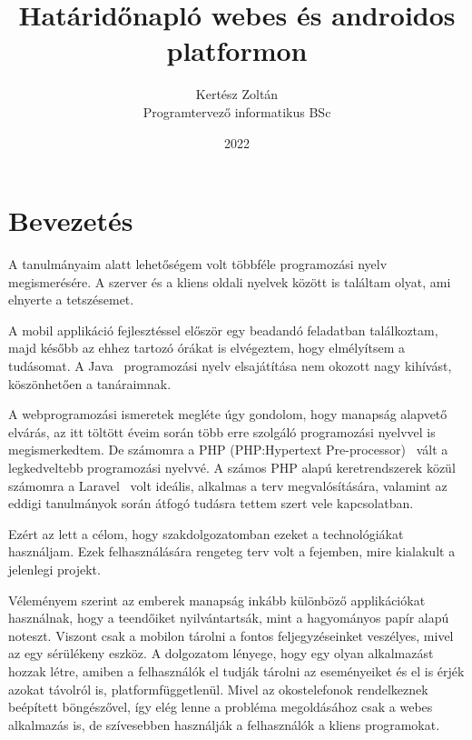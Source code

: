 \documentclass[
]{thesis-ekf}
\theoremstyle{definition}
\theoremstyle{remark}
\begin{document}
	\title{Határidőnapló webes és androidos platformon}
	\author{Kertész Zoltán\\Programtervező informatikus BSc}
	\date{2022}
	\maketitle
	\tableofcontents
	
	\chapter*{Bevezetés}
	A tanulmányaim alatt lehetőségem volt többféle programozási nyelv megismerésére. A szerver és a kliens oldali nyelvek között is találtam olyat, ami elnyerte a tetszésemet. 
	
	A mobil applikáció fejlesztéssel először egy beadandó feladatban találkoztam, majd később az ehhez tartozó órákat is elvégeztem, hogy elmélyítsem a tudásomat. A Java~\cite{java_book} programozási nyelv elsajátítása nem okozott nagy kihívást, köszönhetően a tanáraimnak. 
	
	A webprogramozási ismeretek megléte úgy gondolom, hogy manapság alapvető elvárás, az itt töltött éveim során több erre szolgáló programozási nyelvvel is megismerkedtem. De számomra a PHP (PHP:Hypertext Pre-processor)~\cite{php_doc} vált a legkedveltebb programozási nyelvvé. A számos PHP alapú keretrendszerek közül számomra a Laravel~\cite{laravel_main} volt ideális, alkalmas a terv megvalósítására, valamint az eddigi tanulmányok során átfogó tudásra tettem szert vele kapcsolatban.
	
	Ezért az lett a célom, hogy szakdolgozatomban ezeket a technológiákat használjam. Ezek felhasználására rengeteg terv volt a fejemben, mire kialakult a jelenlegi projekt.
	
	Véleményem szerint az emberek manapság inkább különböző applikációkat használnak, hogy a teendőiket nyilvántartsák, mint a hagyományos papír alapú noteszt. Viszont csak a mobilon tárolni a fontos feljegyzéseinket veszélyes, mivel az egy sérülékeny eszköz. A dolgozatom lényege, hogy egy olyan alkalmazást hozzak létre, amiben a felhasználók el tudják tárolni az eseményeiket és el is érjék azokat távolról is, platformfüggetlenül. Mivel az okostelefonok rendelkeznek beépített böngészővel, így elég lenne a probléma megoldásához csak a webes alkalmazás is, de szívesebben használják a felhasználók a kliens programokat. 
	
\end{document}
